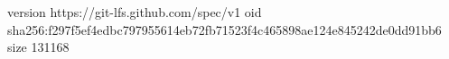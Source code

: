 version https://git-lfs.github.com/spec/v1
oid sha256:f297f5ef4edbc797955614eb72fb71523f4c465898ae124e845242de0dd91bb6
size 131168
